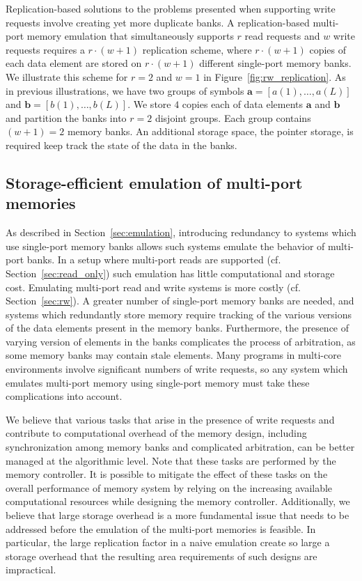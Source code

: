 Replication-based solutions to the problems presented when supporting write requests involve creating yet more duplicate banks. A replication-based multi-port memory emulation that simultaneously supports $r$ read requests and $w$ write requests requires a $r\cdot(w + 1)$ replication scheme, where $r\cdot(w+1)$ copies of each data element are stored on $r\cdot(w + 1)$ different single-port memory banks. We illustrate this scheme for $r = 2$ and $w = 1$ in Figure~\ref{fig:rw_replication}. As in previous illustrations, we have two groups of symbols $\mathbf{a} = [a(1),\ldots, a(L)]$ and $\mathbf{b}  = [b(1),\ldots, b(L)]$. We store $4$ copies each of data elements $\mathbf{a}$ and $\mathbf{b}$ and partition the banks into $r = 2$ disjoint groups. Each group contains $(w + 1) = 2$ memory banks. An additional storage space, the pointer storage, is required keep track the state of the data in the banks.


\subsection{Storage-efficient emulation of multi-port memories}
\label{sec:efficient_emulation}

As described in Section~\ref{sec:emulation}, introducing redundancy to systems which use single-port memory banks allows such systems emulate the behavior of multi-port banks. In a setup where multi-port reads are supported (cf. Section~\ref{sec:read_only}) such emulation has little computational and storage cost. Emulating multi-port read and write systems is more costly (cf. Section~\ref{sec:rw}). A greater number of single-port memory banks are needed, and systems which redundantly store memory require tracking of the various versions of the data elements present in the memory banks. Furthermore, the presence of varying version of elements in the banks complicates the process of arbitration, as some memory banks may contain stale elements. Many programs in multi-core environments involve significant numbers of write requests, so any system which emulates multi-port memory using single-port memory must take these complications into account.

{\color{red}We believe that various tasks that arise in the presence of write requests and contribute to computational overhead of the memory design, including synchronization among memory banks and complicated arbitration, can be better managed at the algorithmic level. Note that these tasks are performed by the memory controller. It is possible to mitigate the effect of these tasks on the overall performance of memory system by relying on the increasing available computational resources while designing the memory controller. Additionally, we believe that large storage overhead is a more fundamental issue that needs to be addressed before the emulation of the multi-port memories is feasible. In particular, the large replication factor in a naive emulation create so large a storage overhead that the resulting area requirements of such designs are impractical.}

